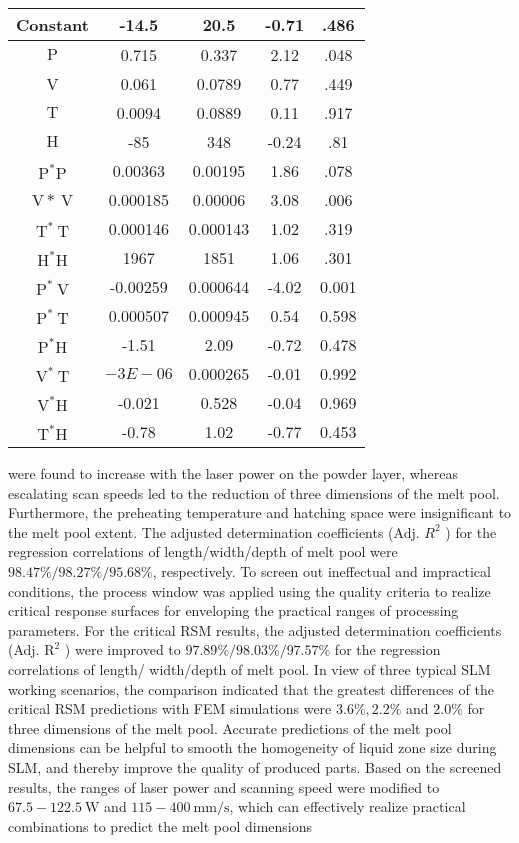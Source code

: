 \documentclass[10pt]{article}
\begin{document}
\begin{center}
\begin{tabular}{|c|c|c|c|c|}
\hline
Constant & -14.5 & 20.5 & -0.71 & .486 \\
\hline
$\mathrm{P}$ & 0.715 & 0.337 & 2.12 & .048 \\
\hline
V & 0.061 & 0.0789 & 0.77 & .449 \\
\hline
$\mathrm{T}$ & 0.0094 & 0.0889 & 0.11 & .917 \\
\hline
$\mathrm{H}$ & -85 & 348 & -0.24 & .81 \\
\hline
$\mathrm{P}^{*} \mathrm{P}$ & 0.00363 & 0.00195 & 1.86 & .078 \\
\hline
$\mathrm{V} * \mathrm{~V}$ & 0.000185 & 0.00006 & 3.08 & .006 \\
\hline
$\mathrm{T}^{*} \mathrm{~T}$ & 0.000146 & 0.000143 & 1.02 & .319 \\
\hline
$\mathrm{H}^{*} \mathrm{H}$ & 1967 & 1851 & 1.06 & .301 \\
\hline
$\mathrm{P}^{*} \mathrm{~V}$ & -0.00259 & 0.000644 & -4.02 & 0.001 \\
\hline
$\mathrm{P}^{*} \mathrm{~T}$ & 0.000507 & 0.000945 & 0.54 & 0.598 \\
\hline
$\mathrm{P}^{*} \mathrm{H}$ & -1.51 & 2.09 & -0.72 & 0.478 \\
\hline
$\mathrm{V}^{*} \mathrm{~T}$ & $-3 E-06$ & 0.000265 & -0.01 & 0.992 \\
\hline
$\mathrm{V}^{*} \mathrm{H}$ & -0.021 & 0.528 & -0.04 & 0.969 \\
\hline
$\mathrm{T}^{*} \mathrm{H}$ & -0.78 & 1.02 & -0.77 & 0.453 \\
\hline
\end{tabular}
\end{center}

were found to increase with the laser power on the powder layer, whereas escalating scan speeds led to the reduction of three dimensions of the melt pool. Furthermore, the preheating temperature and hatching space were insignificant to the melt pool extent. The adjusted determination coefficients (Adj. $R^{2}$ ) for the regression correlations of length/width/depth of melt pool were $98.47 \% / 98.27 \% / 95.68 \%$, respectively. To screen out ineffectual and impractical conditions, the process window was applied using the quality criteria to realize critical response surfaces for enveloping the practical ranges of processing parameters. For the critical RSM results, the adjusted determination coefficients (Adj. $\mathrm{R}^{2}$ ) were improved to $97.89 \% / 98.03 \% / 97.57 \%$ for the regression correlations of length/ width/depth of melt pool. In view of three typical SLM working scenarios, the comparison indicated that the greatest differences of the critical RSM predictions with FEM simulations were $3.6 \%, 2.2 \%$ and $2.0 \%$ for three dimensions of the melt pool. Accurate predictions of the melt pool dimensions can be helpful to smooth the homogeneity of liquid zone size during SLM, and thereby improve the quality of produced parts. Based on the screened results, the ranges of laser power and scanning speed were modified to $67.5-122.5 \mathrm{~W}$ and $115-400 \mathrm{~mm} / \mathrm{s}$, which can effectively realize practical combinations to predict the melt pool dimensions
\end{document}
